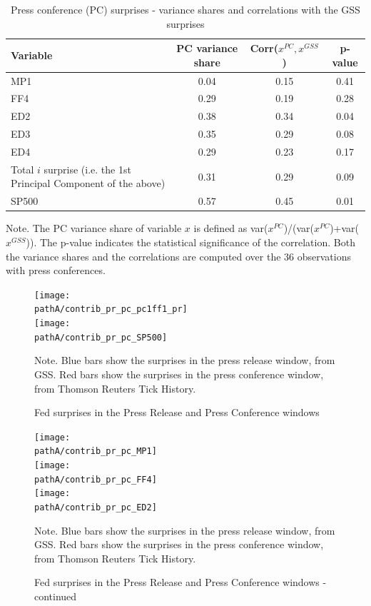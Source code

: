 \documentclass[a4paper,12pt]{article}
\newcommand{\pathA}{}
\begin{document}
\begin{table}[!htbp]
\begin{center}
\caption{Press conference (PC) surprises - variance shares and correlations with the GSS surprises}\label{tab: fed pr and pc}
\begin{tabular}{p{6cm}ccc}
\toprule
Variable & PC variance share & Corr($x^{PC},x^{GSS}$) & p-value \\
\midrule
MP1 & 0.04 & 0.15 & 0.41 \\
FF4 & 0.29 & 0.19 & 0.28 \\
ED2 & 0.38 & 0.34 & 0.04 \\
ED3 & 0.35 & 0.29 & 0.08 \\
ED4 & 0.29 & 0.23 & 0.17 \\
Total $i$ surprise (i.e. the 1st Principal Component of the above) & 0.31 & 0.29 & 0.09 \\
SP500 & 0.57 & 0.45 & 0.01 \\
\bottomrule
\end{tabular}
\end{center}\footnotesize
Note. The PC variance share of variable $x$ is defined as var($x^{PC}$)/(var($x^{PC}$)+var($x^{GSS}$)).
The p-value indicates the statistical significance of the correlation.
Both the variance shares and the correlations are computed over the 36 observations
with press conferences.
\end{table}


\renewcommand{\pathA}{../data/shocks/plots_pconf}
\begin{figure}[p]
\caption{Fed surprises in the Press Release and Press Conference windows}\label{fig: fed pr and pc}
\begin{center}
\texttt{[image: \\pathA/contrib\_pr\_pc\_pc1ff1\_pr]}\\
\texttt{[image: \\pathA/contrib\_pr\_pc\_SP500]}\\
\end{center}
\footnotesize Note. Blue bars show the surprises in the press release window, from GSS. Red bars show the surprises in the press conference window, from Thomson Reuters Tick History.
\end{figure}

\begin{figure}[p]
\caption{Fed surprises in the Press Release and Press Conference windows - continued}\label{fig: fed pr and pc 2}
\begin{center}
\texttt{[image: \\pathA/contrib\_pr\_pc\_MP1]}\\
\texttt{[image: \\pathA/contrib\_pr\_pc\_FF4]}\\
\texttt{[image: \\pathA/contrib\_pr\_pc\_ED2]}\\
\end{center}
\footnotesize Note. Blue bars show the surprises in the press release window, from GSS. Red bars show the surprises in the press conference window, from Thomson Reuters Tick History.
\end{figure}
\end{document}
